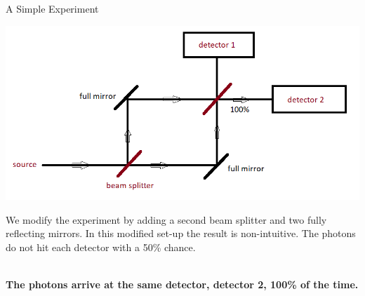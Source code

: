 \documentclass[svgnames,smaller,aspectratio=169]{beamer}
\begin{document}
\begin{frame}[fragile]{A Simple Experiment \cite{interfer}}
  \begin{center}
      \includegraphics[height=.4\textheight]{exp2}
  \end{center}
  We modify the experiment by adding a second beam splitter and two fully reflecting mirrors.
  In this modified set-up the result is non-intuitive. The photons do not hit each detector with a 50\% chance. \\~\

  \textbf{The photons arrive at the same detector, detector 2, 100\% of the time.}

\end{frame}
\end{document}

